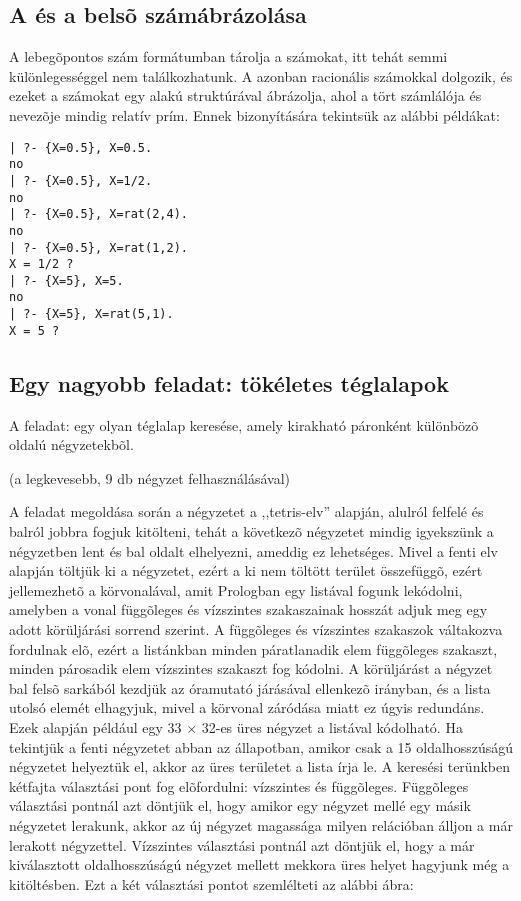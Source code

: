 \subsection{A \clpq és a \clpr belsõ számábrázolása}

A \clpr lebegõpontos szám formátumban tárolja a számokat, itt tehát
semmi különlegességgel nem találkozhatunk. A \clpq azonban racionális
számokkal dolgozik, és ezeket a számokat egy 
alakú struktúrával ábrázolja, ahol a tört számlálója és nevezõje mindig
relatív prím. Ennek bizonyítására tekintsük az alábbi \clpq példákat:

\begin{verbatim}
| ?- {X=0.5}, X=0.5.
no
| ?- {X=0.5}, X=1/2.
no
| ?- {X=0.5}, X=rat(2,4).
no
| ?- {X=0.5}, X=rat(1,2).
X = 1/2 ?
| ?- {X=5}, X=5.
no
| ?- {X=5}, X=rat(5,1).
X = 5 ?
\end{verbatim}

\subsection{Egy nagyobb \clpq feladat: tökéletes téglalapok}

\label{teglalap:clpqr}

A feladat: egy olyan téglalap keresése, amely kirakható páronként különbözõ
oldalú négyzetekbõl.

(a legkevesebb, 9 db négyzet felhasználásával)
\begin{center}
\end{center}

A feladat megoldása során a négyzetet a ,,tetris-elv'' alapján, alulról
felfelé és balról jobbra fogjuk kitölteni, tehát a következõ négyzetet
mindig igyekszünk a négyzetben lent és bal oldalt elhelyezni, ameddig
ez lehetséges. Mivel a fenti elv alapján töltjük ki a négyzetet, ezért a
ki nem töltött terület összefüggõ, ezért jellemezhetõ a körvonalával, amit
Prologban egy listával fogunk lekódolni, amelyben a vonal függõleges és
vízszintes szakaszainak hosszát adjuk meg egy adott körüljárási sorrend
szerint. A függõleges és vízszintes szakaszok váltakozva fordulnak elõ,
ezért a listánkban minden páratlanadik elem függõleges szakaszt, minden
párosadik elem vízszintes szakaszt fog kódolni. A körüljárást a négyzet
bal felsõ sarkából kezdjük az óramutató járásával ellenkezõ irányban, és
a lista utolsó elemét elhagyjuk, mivel a körvonal záródása miatt ez úgyis
redundáns. Ezek alapján például egy 33 $\times$ 32-es üres négyzet a
\cd{[-32,33,32]} listával kódolható. Ha tekintjük a fenti négyzetet abban
az állapotban, amikor csak a 15 oldalhosszúságú négyzetet helyeztük el,
akkor az üres területet a \cd{[-17,15,-15,18,32]} lista írja le.
\br
A keresési terünkben kétfajta választási pont fog elõfordulni: vízszintes
és függõleges. Függõleges választási pontnál azt döntjük el, hogy amikor
egy négyzet mellé egy másik négyzetet lerakunk, akkor az új négyzet magassága
milyen relációban álljon a már lerakott négyzettel. Vízszintes választási
pontnál azt döntjük el, hogy a már kiválasztott oldalhosszúságú négyzet
mellett mekkora üres helyet hagyjunk még a kitöltésben. Ezt a két választási
pontot szemlélteti az alábbi ábra:

